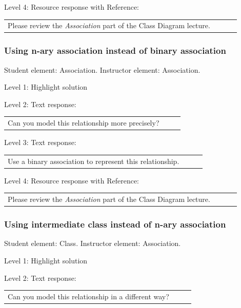 \noindent Level 4: Resource response with Reference: \medskip

\begin{tabular}{|p{0.9\linewidth}}
Please review the \textit{Association} part of the Class Diagram lecture.
\end{tabular} \medskip


\subsubsection{Using n-ary association instead of binary association}

Student element: Association. Instructor element: Association. \medskip

\noindent Level 1: Highlight solution  \medskip

\noindent Level 2: Text response: \medskip

\begin{tabular}{|p{0.9\linewidth}}
Can you model this relationship more precisely?
\end{tabular} \medskip

\noindent Level 3: Text response: \medskip

\begin{tabular}{|p{0.9\linewidth}}
Use a binary association to represent this relationship.
\end{tabular} \medskip

\noindent Level 4: Resource response with Reference: \medskip

\begin{tabular}{|p{0.9\linewidth}}
Please review the \textit{Association} part of the Class Diagram lecture.
\end{tabular} \medskip


\subsubsection{Using intermediate class instead of n-ary association}

Student element: Class. Instructor element: Association. \medskip

\noindent Level 1: Highlight solution  \medskip

\noindent Level 2: Text response: \medskip

\begin{tabular}{|p{0.9\linewidth}}
Can you model this relationship in a different way?
\end{tabular} \medskip

